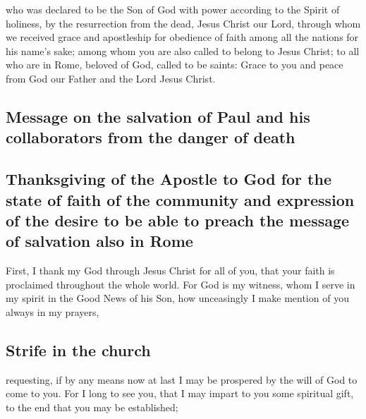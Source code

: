  who was declared to be the Son of God with power
according to the Spirit of holiness, by the resurrection from the dead,
Jesus Christ our Lord,  through whom we received grace and
apostleship for obedience of faith among all the nations for his name's
sake;  among whom you are also called to belong to Jesus
Christ;  to all who are in Rome, beloved of God, called to
be saints: Grace to you and peace from God our Father and the Lord Jesus
Christ.

\hypertarget{message-on-the-salvation-of-paul-and-his-collaborators-from-the-danger-of-death}{%
\subsection{Message on the salvation of Paul and his collaborators from
the danger of
death}\label{message-on-the-salvation-of-paul-and-his-collaborators-from-the-danger-of-death}}

\hypertarget{thanksgiving-of-the-apostle-to-god-for-the-state-of-faith-of-the-community-and-expression-of-the-desire-to-be-able-to-preach-the-message-of-salvation-also-in-rome}{%
\subsection{Thanksgiving of the Apostle to God for the state of faith of
the community and expression of the desire to be able to preach the
message of salvation also in
Rome}\label{thanksgiving-of-the-apostle-to-god-for-the-state-of-faith-of-the-community-and-expression-of-the-desire-to-be-able-to-preach-the-message-of-salvation-also-in-rome}}

 First, I thank my God through Jesus Christ for all of
you, that your faith is proclaimed throughout the whole world.
 For God is my witness, whom I serve in my spirit in the
Good News of his Son, how unceasingly I make mention of you always in my
prayers,

\hypertarget{strife-in-the-church}{%
\subsection{Strife in the church}\label{strife-in-the-church}}

 requesting, if by any means now at last I may be
prospered by the will of God to come to you.  For I long
to see you, that I may impart to you some spiritual gift, to the end
that you may be established;

